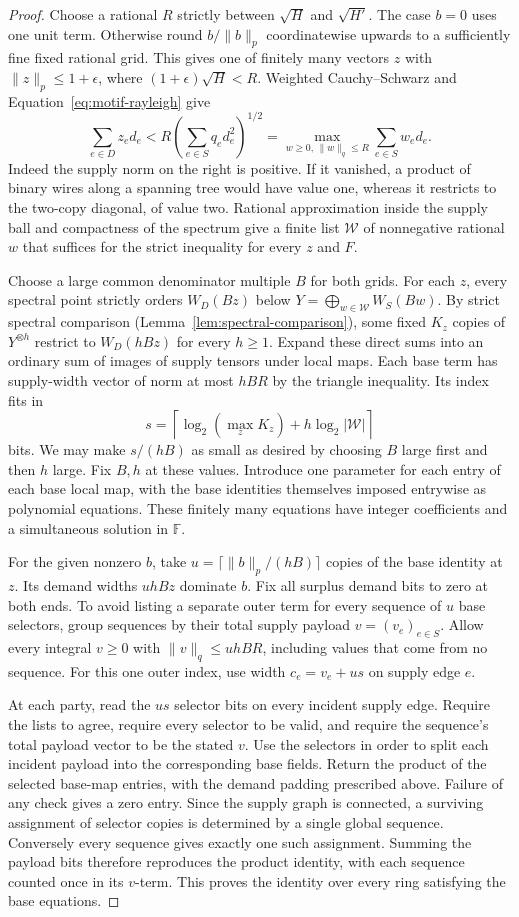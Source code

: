 \begin{proof}
Choose a rational $R$ strictly between $\sqrt H$ and $\sqrt{H'}$.
The case $b=0$ uses one unit term. Otherwise round $b/\|b\|_p$
coordinatewise upwards to a sufficiently fine fixed rational grid. This
gives one of finitely many vectors $z$ with $\|z\|_p\le 1+\epsilon$,
where $(1+\epsilon)\sqrt H<R$. Weighted Cauchy--Schwarz and
Equation~\eqref{eq:motif-rayleigh} give
\[
  \sum_{e\in D}z_e d_e
   <R\left(\sum_{e\in S}q_e d_e^2\right)^{1/2}
    =\max_{w\ge0,\,\|w\|_q\le R}\sum_{e\in S}w_e d_e .
\]
Indeed the supply norm on the right is positive. If it vanished, a
product of binary wires along a spanning tree would have value one,
whereas it restricts to the two-copy diagonal, of value two. Rational
approximation inside the supply ball and compactness of the spectrum
give a finite list $\mathcal W$ of nonnegative rational $w$ that suffices
for the strict inequality for every $z$ and $F$.

Choose a large common denominator multiple $B$ for both grids. For each
$z$, every spectral point strictly orders $W_D(Bz)$ below
$Y=\bigoplus_{w\in\mathcal W}W_S(Bw)$. By strict spectral comparison
(Lemma~\ref{lem:spectral-comparison}), some fixed $K_z$ copies of $Y^{\otimes h}$
restrict to $W_D(hBz)$ for every $h\ge1$. Expand these direct sums into
an ordinary sum of images of supply tensors under local maps. Each
base term has supply-width vector of norm at most $hBR$ by the triangle
inequality. Its index fits in
\[
   s=\left\lceil\log_2(\max_z K_z)+h\log_2|\mathcal W|\right\rceil
\]
bits. We may make $s/(hB)$ as small as desired by choosing $B$ large
first and then $h$ large. Fix $B,h$ at these values. Introduce one
parameter for each entry of each base local map, with the base
identities themselves imposed entrywise as polynomial equations.
These finitely many equations have integer coefficients and a simultaneous
solution in $\mathbb F$.

For the given nonzero $b$, take $u=\lceil\|b\|_p/(hB)\rceil$ copies of
the base identity at $z$. Its demand widths $uhBz$ dominate $b$. Fix
all surplus demand bits to zero at both ends. To avoid listing a separate
outer term for every sequence of $u$ base selectors, group sequences
by their total supply payload $v=(v_e)_{e\in S}$. Allow every integral
$v\ge0$ with $\|v\|_q\le uhBR$, including values that come from no
sequence. For this one outer index, use width $c_e=v_e+us$ on supply
edge $e$.

At each party, read the $us$ selector bits on every incident supply edge.
Require the lists to agree, require every selector to be valid, and
require the sequence's total payload vector to be the stated $v$.
Use the selectors in order to split each incident payload into the
corresponding base fields. Return the product of the selected base-map
entries, with the demand padding prescribed above. Failure of any check
gives a zero entry. Since the supply graph is connected, a surviving
assignment of selector copies is determined by a single global sequence.
Conversely every sequence gives exactly one such assignment. Summing
the payload bits therefore reproduces the product identity, with each
sequence counted once in its $v$-term. This proves the identity over every
ring satisfying the base equations.


\end{proof}
